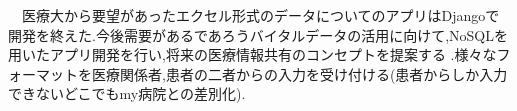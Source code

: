 　医療大から要望があったエクセル形式のデータについてのアプリはDjangoで開発を終えた.今後需要があるであろうバイタルデータの活用に向けて,NoSQLを用いたアプリ開発を行い,将来の医療情報共有のコンセプトを提案する .様々なフォーマットを医療関係者,患者の二者からの入力を受け付ける(患者からしか入力できないどこでもmy病院との差別化).
